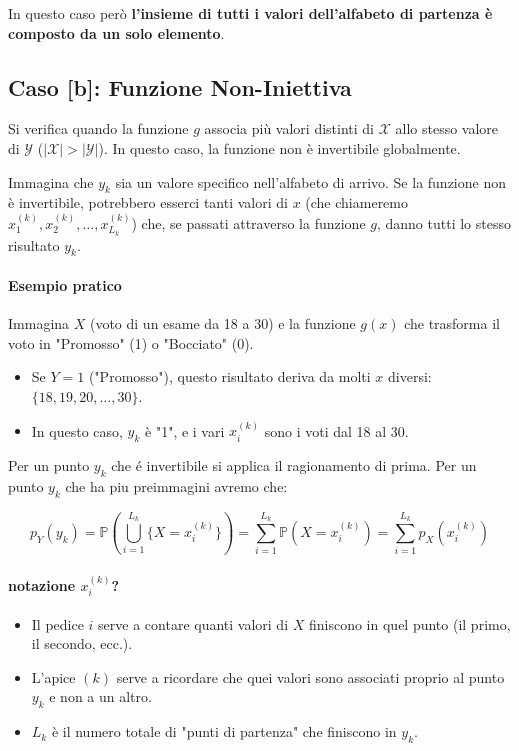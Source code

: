 In questo caso però \textbf{l'insieme di tutti i valori dell'alfabeto di partenza è composto da un solo elemento}.

\subsection{Caso [b]: Funzione Non-Iniettiva}

Si verifica quando la funzione $g$ associa più valori distinti di $\mathcal{X}$ allo stesso valore di $\mathcal{Y}$ ($|\mathcal{X}| > |\mathcal{Y}|$). In questo caso, la funzione non è invertibile globalmente.

Immagina che $y_k$ sia un valore specifico nell'alfabeto di arrivo. Se la funzione non è invertibile, potrebbero esserci tanti valori di $x$ (che chiameremo $x_1^{(k)}, x_2^{(k)}, \dots, x_{L_k}^{(k)}$) che, se passati attraverso la funzione $g$, danno tutti lo stesso risultato $y_k$.

\paragraph{Esempio pratico}
Immagina $X$ (voto di un esame da 18 a 30) e la funzione $g(x)$ che trasforma il voto in "Promosso" (1) o "Bocciato" (0).
\begin{itemize}
    \item Se $Y = 1$ ("Promosso"), questo risultato deriva da molti $x$ diversi: $\{18, 19, 20, \dots, 30\}$.
    \item In questo caso, $y_k$ è "1", e i vari $x_i^{(k)}$ sono i voti dal 18 al 30.
\end{itemize}
Per un punto $y_k$ che é invertibile si applica il ragionamento di prima. 
\newpage
Per un punto $y_k$ che ha piu preimmagini avremo che:

\begin{equation}
\boxed{p_Y(y_k) = \mathbb{P}\left( \bigcup_{i=1}^{L_k} \{X = x_i^{(k)}\} \right) = \sum_{i=1}^{L_k} \mathbb{P}(X = x_i^{(k)}) = \sum_{i=1}^{L_k} p_X(x_i^{(k)})}
\end{equation}

\paragraph{notazione $x_i^{(k)}$?}
\begin{itemize}
    \item Il pedice $i$ serve a contare quanti valori di $X$ finiscono in quel punto (il primo, il secondo, ecc.).
    \item L'apice $(k)$ serve a ricordare che quei valori sono associati proprio al punto $y_k$ e non a un altro.
    \item $L_k$ è il numero totale di "punti di partenza" che finiscono in $y_k$.
\end{itemize}

